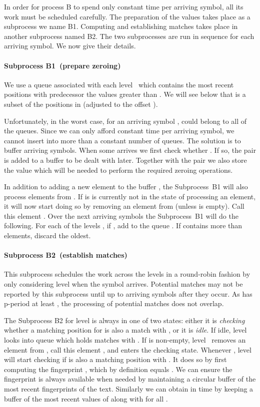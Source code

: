 \documentclass[11pt,a4paper]{article}
\theoremstyle{theorem}
\newcommand{\pperiod}{\mbox{p-period}\xspace}
\newcommand{\procB}{\textup{B}\xspace}
\newcommand{\procBdelta}{\textup{B1}\xspace}
\newcommand{\procBphi}{\textup{B2}\xspace}
\begin{document}
In order for process \procB to spend only constant time per arriving symbol, all its work must be scheduled carefully. The preparation of the  values takes place as a subprocess we name \procBdelta. Computing  and establishing matches takes place in another subprocess named \procBphi. The two subprocesses are run in sequence for each arriving symbol.
We now give their details.


\paragraph{Subprocess \procBdelta~(prepare zeroing)}
We use a queue  associated with each level~ which contains the most recent  positions with predecessor the values greater than . We will see below that  is a subset of the positions in  (adjusted to the offset ).

Unfortunately, in the worst case, for an arriving symbol ,  could belong to all of the  queues. Since we can only afford constant time per arriving symbol, we cannot insert  into more than a constant number of queues. The solution is to buffer arriving symbols.
When some  arrives we first check whether . If so, the pair  is added to a buffer  to be dealt with later.
Together with the pair we also store the value  which will be needed to perform the required zeroing operations.

In addition to adding a new element to the buffer , the Subprocess~\procBdelta will also process elements from . If is is currently not in the state of processing an element, it will now start doing so by removing an element from  (unless  is empty). Call this element . Over the next  arriving symbols the Subprocess~\procBdelta will do the following. For each of the  levels , if , add  to the queue . If  contains more than  elements, discard the oldest.


\paragraph{Subprocess \procBphi~(establish matches)} This subprocess schedules the work across the levels in a round-robin fashion by only considering level  when the symbol  arrives.  Potential matches may not be reported by this subprocess until up to  arriving symbols after they occur. As  has \pperiod at least , the processing of potential matches does not overlap.

The Subprocess \procBphi for level  is always in one of two states: either it is \emph{checking} whether a matching position  for  is also a match with , or it is \emph{idle}. If idle, level~ looks into queue  which holds matches with . If  is
non-empty, level~ removes an element from , call this element , and enters the checking state. Whenever ,
level~ will start checking if  is also a matching position with . It does so by first computing the fingerprint ,
which by definition equals . We can ensure the fingerprint  is always available when needed by maintaining a circular buffer of the most recent  fingerprints of the text. Similarly we can obtain  in  time by keeping a buffer of the most recent  values of  along with  for all . \label{page:buff}
\end{document}
